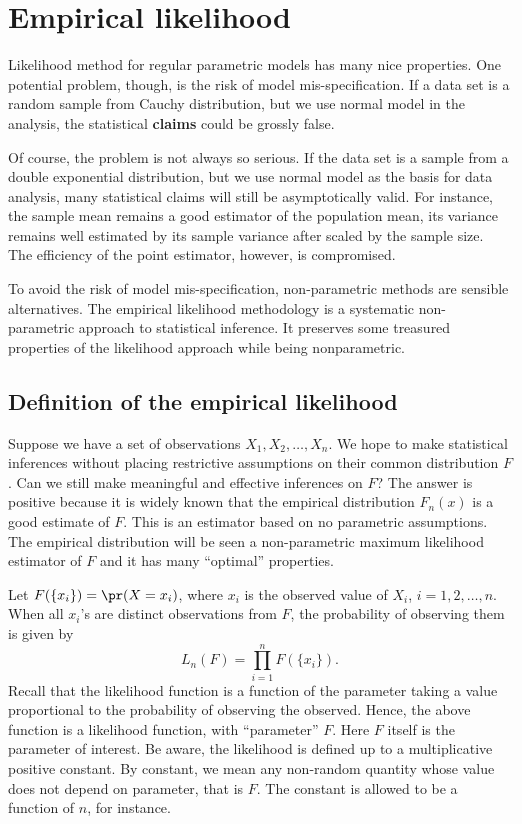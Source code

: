 \chapter{Empirical likelihood}

Likelihood method for regular parametric models has many nice properties. 
One potential problem, though, is the risk of model mis-specification. 
If a data set is a random sample from Cauchy distribution, 
but we use normal model in the analysis, the statistical {\bf claims}
could be grossly false. 

Of course, the problem is not always so serious. 
If the data set is a sample from a double exponential distribution,
but we use normal model as the basis for data analysis, 
many statistical claims will still be asymptotically valid.
For instance, the sample mean remains a good
estimator of the population mean, its variance remains
well estimated by its sample variance after scaled by the sample size.
The efficiency of the point estimator, however, is compromised.

To avoid the risk of model mis-specification, non-parametric methods are sensible
alternatives. The empirical likelihood methodology is 
a systematic non-parametric approach to statistical inference.
It preserves some treasured properties of the likelihood
approach while being nonparametric.

\section{Definition of the empirical likelihood}

Suppose we have a set of \iid observations $X_1, X_2, \ldots, X_n$. 
We hope to make statistical inferences without placing restrictive assumptions 
on their common distribution $F$. 
Can we still make meaningful and effective inferences on $F$? 
The answer is positive because it is widely known
that the empirical distribution $F_n(x)$ 
is a good estimate of $F$. This is an estimator based on no
parametric assumptions. The empirical distribution will be seen
a non-parametric maximum likelihood estimator of $F$
and it has many ``optimal'' properties.

Let $F(\{x_i\})= \pr(X= x_i)$, where $x_i$ is the observed value 
of $X_i$, $i=1, 2, \ldots, n$. 
When all $x_i$'s are distinct observations from $F$, 
the probability of observing them is given by
\[
L_n(F) = \prod_{i=1}^n F(\{x_i\}).
\]
Recall that the likelihood function
is a function of the parameter taking a value
proportional to the probability of observing the observed.
Hence, the above function is a likelihood function, with
``parameter'' $F$. Here $F$ itself is the parameter of interest.
Be aware, the likelihood is defined up to a multiplicative
positive constant. By constant, we mean any non-random
quantity whose value does not depend on parameter, that is $F$.
The constant is allowed to be a function of $n$, for instance.

